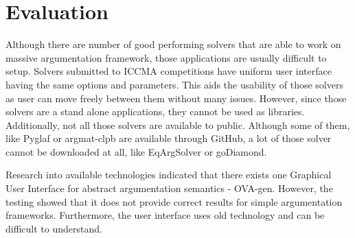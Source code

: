 \section{Evaluation}
Although there are number of good performing solvers that are able to work on massive argumentation framework, those applications are usually difficult to setup. Solvers submitted to ICCMA competitions have uniform user interface having the same options and parameters. This aids the usability of those solvers as user can move freely between them without many issues. However, since those solvers are a stand alone applications, they cannot be used as libraries. Additionally, not all those solvers are available to public. Although some of them, like Pyglaf or argmat-clpb are available through GitHub, a lot of those solver cannot be downloaded at all, like EqArgSolver or goDiamond.


Research into available technologies indicated that there exists one Graphical User Interface for abstract argumentation semantics - OVA-gen. However, the testing showed that it does not provide correct results for simple argumentation frameworks. Furthermore, the user interface uses old technology and can be difficult to understand.